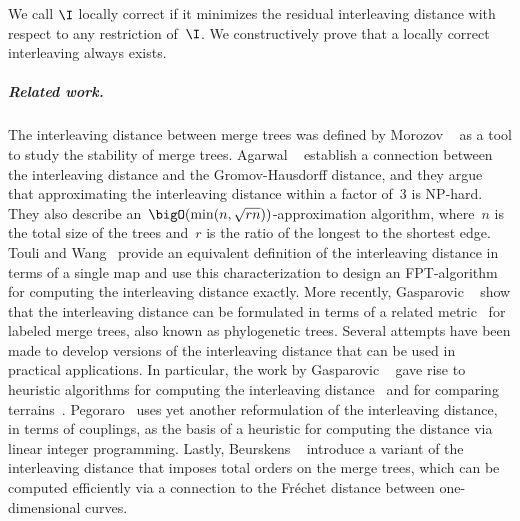 We call $\I$ locally correct if it minimizes the residual interleaving distance with respect to any restriction of~$\I$.
We constructively prove that a locally correct interleaving always exists.
%
\subparagraph{Related work.}
The interleaving distance between merge trees was defined by Morozov \etal~\cite{morozov2013interleaving} as a tool to study the stability of merge trees.
Agarwal \etal~\cite{agarwal2018computing} establish a connection between the interleaving distance and the Gromov-Hausdorff distance, and they argue that approximating the interleaving distance within a factor of~$3$ is NP-hard.
They also describe an~$\bigO(\min(n, \sqrt{rn}))$-approximation algorithm, where~$n$ is the total size of the trees and~$r$ is the ratio of the longest to the shortest edge.
Touli and Wang~\cite{touli2022fpt} provide an equivalent definition of the interleaving distance in terms of a single map and use this characterization to design an FPT-algorithm for computing the interleaving distance exactly.
More recently, Gasparovic \etal~\cite{gasparovic2024intrinsic} show that the interleaving distance can be formulated in terms of a related metric~\cite{munch2019the} for labeled merge trees, also known as phylogenetic trees.
%
Several attempts have been made to develop versions of the interleaving distance that can be used in practical applications.
In particular, the work by Gasparovic \etal~\cite{gasparovic2024intrinsic} gave rise to heuristic algorithms for computing the interleaving distance~\cite{curry2022decorated} and for comparing terrains~\cite{yan2022geometry, yan2020structural}.
Pegoraro~\cite{pegoraro2025graph-matching} uses yet another reformulation of the interleaving distance, in terms of couplings, as the basis of a heuristic for computing the distance via linear integer programming.
Lastly, Beurskens \etal~\cite{beurskens2025relating} introduce a variant of the interleaving distance that imposes total orders on the merge trees, which can be computed efficiently via a connection to the Fréchet distance between one-dimensional curves.
%
